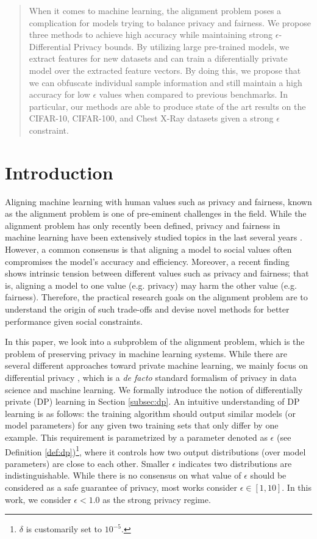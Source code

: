 \documentclass{article}
\theoremstyle{definition}
\begin{document}
\begin{abstract}
When it comes to machine learning, the alignment problem poses a complication for models trying to balance privacy and fairness. We propose three methods to achieve high accuracy while maintaining strong $\epsilon$-Differential Privacy bounds. By utilizing large pre-trained models, we extract features for new datasets and can train a diferentially private model over the extracted feature vectors. By doing this, we propose that we can obfuscate individual sample information and still maintain a high accuracy for low $\epsilon$ values when compared to previous benchmarks. In particular, our methods are able to produce state of the art results on the CIFAR-10, CIFAR-100, and Chest X-Ray datasets given a strong $\epsilon$ constraint.
\end{abstract}

\section{Introduction}
Aligning machine learning with human values such as privacy and fairness, known as the alignment problem \cite{christian2020alignment} is one of pre-eminent challenges in the field. While the alignment problem has only recently been defined, privacy and fairness in machine learning have been extensively studied topics in the last several years \cite{liu2021machine,mehrabi2021survey}. However, a common consensus is that aligning a model to social values often compromises the model's accuracy and efficiency. Moreover, a recent finding \cite{bagdasaryan2019differential} shows intrinsic tension between different values such as privacy and fairness; that is, aligning a model to one value (e.g. privacy) may harm the other value (e.g. fairness). Therefore, the practical research goals on the alignment problem are to understand the origin of such trade-offs and devise novel methods for better performance given social constraints.

In this paper, we look into a subproblem of the alignment problem, which is the problem of preserving privacy in machine learning systems. While there are several different approaches toward private machine learning, we mainly focus on differential privacy \cite{dwork2006differential}, which is a \textit{de facto} standard formalism of privacy in data science and machine learning. We formally introduce the notion of differentially private (DP) learning in Section \ref{subsec:dp}. An intuitive understanding of DP learning is as follows: the training algorithm should output similar models (or model parameters) for any given two training sets that only differ by one example. This requirement is parametrized by a parameter denoted as $\epsilon$ (see Definition \ref{def:dp})\footnote{$\delta$ is customarily set to $10^{-5}$.}, where it controls how two output distributions (over model parameters) are close to each other. Smaller $\epsilon$ indicates two distributions are indistinguishable. While there is no consensus on what value of $\epsilon$ should be considered as a safe guarantee of privacy, most works consider $\epsilon\in[1,10]$. In this work, we consider $\epsilon<1.0$ as the strong privacy regime.
\end{document}
